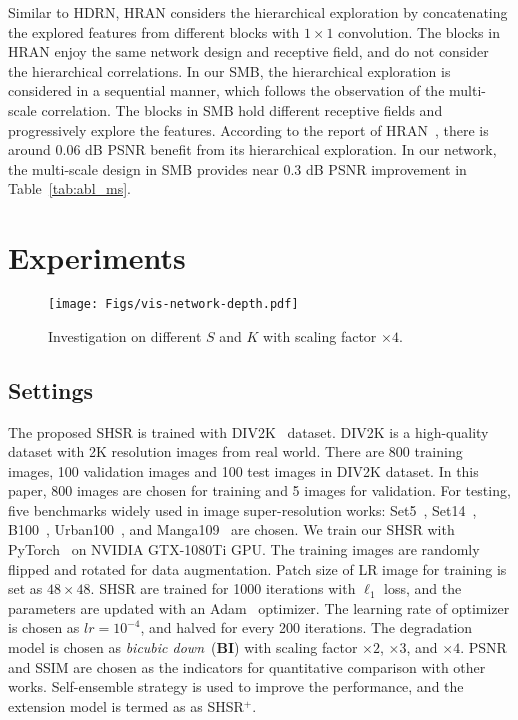 \documentclass[manuscript,screen]{acmart}
\begin{document}
Similar to HDRN, HRAN considers the hierarchical exploration by concatenating the explored features from different blocks with $1\times1$ convolution. The blocks in HRAN enjoy the same network design and receptive field, and do not consider the hierarchical correlations. In our SMB, the hierarchical exploration is considered in a sequential manner, which follows the observation of the multi-scale correlation. The blocks in SMB hold different receptive fields and progressively explore the features. According to the report of HRAN~\cite{hran}, there is around 0.06 dB PSNR benefit from its hierarchical exploration. In our network, the multi-scale design in SMB provides near 0.3 dB PSNR improvement in Table~\ref{tab:abl_ms}.


\section{Experiments}

\begin{figure}[t]
	\centering
	\texttt{[image: Figs/vis-network-depth.pdf]}
	\caption{Investigation on different $S$ and $K$ with scaling factor $\times4$.}
	\label{fig:vis-network-depth}
\end{figure}

\subsection{Settings}
The proposed SHSR is trained with DIV2K~\cite{div2k} dataset. DIV2K is a high-quality dataset with 2K resolution images from real world. There are 800 training images, 100 validation images and 100 test images in DIV2K dataset. In this paper, 800 images are chosen for training and 5 images for validation. For testing, five benchmarks widely used in image super-resolution works: Set5~\cite{set5}, Set14~\cite{set14}, B100~\cite{b100}, Urban100~\cite{urban100}, and Manga109~\cite{manga109} are chosen. We train our SHSR with PyTorch~\cite{pytorch} on NVIDIA GTX-1080Ti GPU. The training images are randomly flipped and rotated for data augmentation. Patch size of LR image for training is set as $48\times48$. SHSR are trained for 1000 iterations with $\ell_1$ loss, and the parameters are updated with an Adam~\cite{adam} optimizer. The learning rate of optimizer is chosen as $lr=10^{-4}$, and halved for every 200 iterations. The degradation model is chosen as \textit{bicubic down}~(\textbf{BI}) with scaling factor $\times2$, $\times3$, and $\times4$. PSNR and SSIM are chosen as the indicators for quantitative comparison with other works. Self-ensemble strategy is used to improve the performance, and the extension model is termed as as SHSR$^+$.
\end{document}
